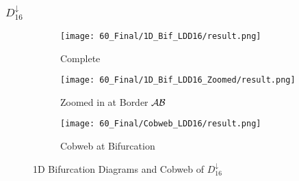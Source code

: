 \subsubsection{$D_{16}^\downarrow$}

\begin{figure}
    \centering
    \begin{subfigure}{0.3\textwidth}
        \centering
        \texttt{[image: 60\_Final/1D\_Bif\_LDD16/result.png]}
        \caption{Complete}
        \label{fig:final.bifurcation.D.down}
    \end{subfigure}
    \begin{subfigure}{0.3\textwidth}
        \centering
        \texttt{[image: 60\_Final/1D\_Bif\_LDD16\_Zoomed/result.png]}
        \caption{Zoomed in at Border $\mathcal{A}\mathcal{B}$}
        \label{fig:final.bifurcation.D.down.zoomed}
    \end{subfigure}
    \begin{subfigure}{0.3\textwidth}
        \centering
        \texttt{[image: 60\_Final/Cobweb\_LDD16/result.png]}
        \caption{Cobweb at Bifurcation}
        \label{fig:final.bifurcation.D.down.cobweb}
    \end{subfigure}
    \caption{1D Bifurcation Diagrams and Cobweb of $D_{16}^\downarrow$}
\end{figure}
